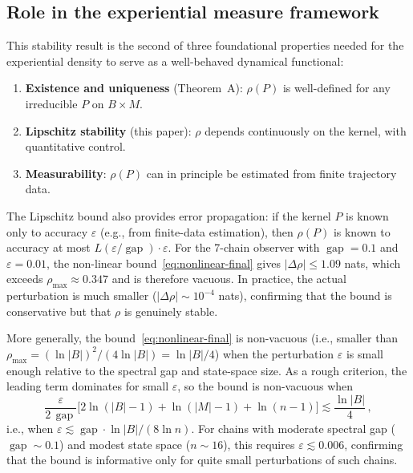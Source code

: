\documentclass[11pt,a4paper]{article}
\DeclareMathOperator{\gap}{gap}
\begin{document}
\subsection{Role in the experiential measure framework}

This stability result is the second of three foundational properties
needed for the experiential density to serve as a well-behaved
dynamical functional:

\begin{enumerate}
  \item \textbf{Existence and uniqueness} (Theorem~A): $\rho(P)$ is
    well-defined for any irreducible $P$ on $B \times M$.
  \item \textbf{Lipschitz stability} (this paper): $\rho$ depends
    continuously on the kernel, with quantitative control.
  \item \textbf{Measurability}: $\rho(P)$ can in principle be estimated
    from finite trajectory data.
\end{enumerate}

The Lipschitz bound also provides error propagation: if the kernel $P$
is known only to accuracy $\varepsilon$ (e.g., from finite-data
estimation), then $\rho(P)$ is known to accuracy at most
$L(\varepsilon/\gap) \cdot \varepsilon$.  For the 7-chain observer
with $\gap = 0.1$ and $\varepsilon = 0.01$, the non-linear
bound~\eqref{eq:nonlinear-final} gives $|\Delta\rho| \le 1.09$ nats,
which exceeds $\rho_{\max} \approx 0.347$ and is therefore vacuous.
In practice, the actual perturbation is much smaller
($|\Delta\rho| \sim 10^{-4}$ nats), confirming that the bound is
conservative but that $\rho$ is genuinely stable.

More generally, the bound~\eqref{eq:nonlinear-final} is non-vacuous
(i.e., smaller than $\rho_{\max} = (\ln|B|)^2/(4\ln|B|) = \ln|B|/4$)
when the perturbation $\varepsilon$ is small enough relative to the
spectral gap and state-space size.  As a rough criterion, the leading
term dominates for small $\varepsilon$, so the bound is non-vacuous when
\[
  \frac{\varepsilon}{2\,\gap}\bigl[2\ln(|B|-1) + \ln(|M|-1) + \ln(n-1)\bigr]
  \lesssim \frac{\ln|B|}{4}\,,
\]
i.e., when $\varepsilon \lesssim \gap \cdot \ln|B| / (8\ln n)$.  For
chains with moderate spectral gap ($\gap \sim 0.1$) and modest state
space ($n \sim 16$), this requires $\varepsilon \lesssim 0.006$,
confirming that the bound is informative only for quite small
perturbations of such chains.
\end{document}
